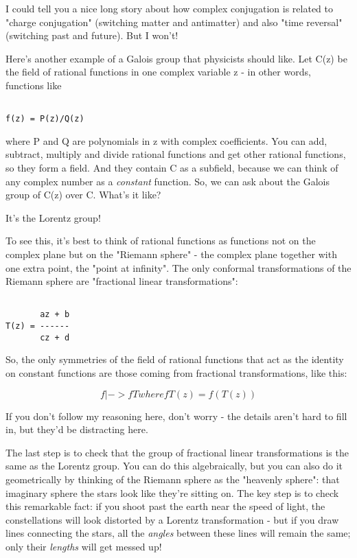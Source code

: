 I could tell you a nice long story about how complex conjugation is
related to "charge conjugation" (switching matter and antimatter) and 
also "time reversal" (switching past and future).  But I won't!

Here's another example of a Galois group that physicists should like.  
Let C(z) be the field of rational functions in one complex variable z -
in other words, functions like


\begin{verbatim}

f(z) = P(z)/Q(z)
\end{verbatim}
    
where P and Q are polynomials in z with complex coefficients.  You can 
add, subtract, multiply and divide rational functions and get other 
rational functions, so they form a field.  And they contain C as a 
subfield, because we can think of any complex number as a \emph{constant}
function.  So, we can ask about the Galois group of C(z) over C.
What's it like?

It's the Lorentz group!

To see this, it's best to think of rational functions as functions not
on the complex plane but on the "Riemann sphere" - the complex plane 
together with one extra point, the "point at infinity".  The only 
conformal transformations of the Riemann sphere are "fractional linear
transformations":


\begin{verbatim}

       az + b
T(z) = ------
       cz + d
\end{verbatim}
    
So, the only symmetries of the field of rational functions that 
act as the identity on constant functions are those coming from 
fractional transformations, like this:


$$

f |-> fT                        where fT(z) = f(T(z)) 
$$
    
If you don't follow my reasoning here, don't worry - the details aren't 
hard to fill in, but they'd be distracting here.  

The last step is to check that the group of fractional linear 
transformations is the same as the Lorentz group.  You can do this 
algebraically, but you can also do it geometrically by thinking of the 
Riemann sphere as the "heavenly sphere": that imaginary sphere the stars 
look like they're sitting on.  The key step is to check this remarkable fact: 
if you shoot past the earth near the speed of light, the constellations will
look distorted by a Lorentz transformation - but if you draw lines connecting
the stars, all the \emph{angles} between these lines 
will remain the same; only 
their \emph{lengths} will get messed up!  

